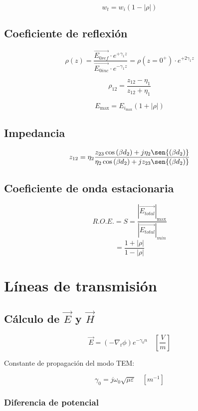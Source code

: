 \documentclass[12pt,a4paper]{article}
\begin{document}
\[ w_{t} = w_{i} (1 - |\rho|) \]

\subsection{Coeficiente de reflexión}
\label{sub:coeficiente_de_reflexion}

\[ \rho (z) = \frac{\vec{E_{0 ref}} \cdot e^{+\gamma_1 z}}{\vec{E_{0 inc}}
\cdot e^{-\gamma_1 z}} = \rho (z=0^+) \cdot e^{+2\gamma_1 z} \]

\[ \rho_{12} = \frac{z_{12} - \eta_1}{z_{12} + \eta_1} \]

\[ E_{\max} = E_{i_{\max}} (1 + |\rho|) \]

\subsection{Impedancia}
\label{sub:impedancia}

\[ z_{12} = \eta_2
\frac{z_{23} \cos{(\beta d_2)} + j \eta_2 \sen{(\beta d_2)}}
{\eta_2 \cos{(\beta d_2)} + j z_{23} \sen{(\beta d_2)}} \]

\subsection{Coeficiente de onda estacionaria}
\label{sub:coeficiente_de_onda_estacionaria}

\[ R.O.E. = S = \frac{\left| \vec{E_{total}} \right|_{\max}}{\left|
\vec{E_{total}} \right|_{min}} \]
\[ = \frac{1+|\rho|}{1-|\rho|}  \]

\section{Líneas de transmisión}
\label{sec:lineas_de_transmision}

\subsection{Cálculo de $ \vec{E} $ y $ \vec{H} $}
\label{sub:calculo_de_E_y_H}

\[ \vec{E} = (- \nabla_t \phi) e^{- \gamma_0 n} \quad \left[ \frac{V}{m} \right] \]

Constante de propagación del modo TEM:

\[ \gamma_0 = j \omega_0 \sqrt{\mu \varepsilon} \quad [m^{-1}] \]

\subsubsection{Diferencia de potencial}
\label{ssub:diferencia_de_potencial}
\end{document}
